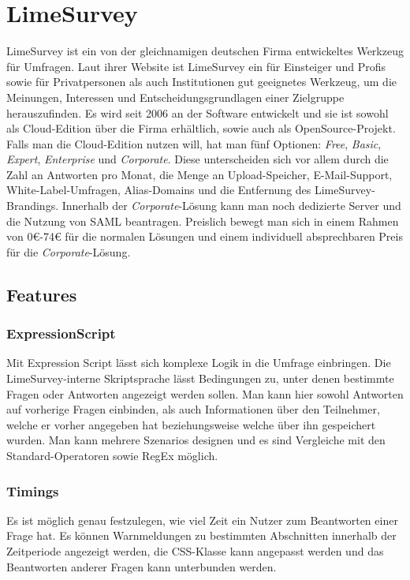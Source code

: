\section{LimeSurvey}

LimeSurvey ist ein von der gleichnamigen deutschen Firma entwickeltes Werkzeug für Umfragen.
Laut ihrer Website ist LimeSurvey ein für Einsteiger und Profis sowie für Privatpersonen als auch Institutionen gut geeignetes Werkzeug, um die Meinungen, Interessen und Entscheidungsgrundlagen einer Zielgruppe herauszufinden.
Es wird seit 2006 an der Software entwickelt und sie ist sowohl als Cloud-Edition über die Firma erhältlich, sowie auch als OpenSource-Projekt.\\

Falls man die Cloud-Edition nutzen will, hat man fünf Optionen: \textit{Free}, \textit{Basic}, \textit{Expert}, \textit{Enterprise} und \textit{Corporate}.
Diese unterscheiden sich vor allem durch die Zahl an Antworten pro Monat, die Menge an Upload-Speicher, E-Mail-Support, White-Label-Umfragen, Alias-Domains und die Entfernung des LimeSurvey-Brandings.
Innerhalb der \textit{Corporate}-Lösung kann man noch dedizierte Server und die Nutzung von SAML beantragen.
Preislich bewegt man sich in einem Rahmen von 0€-74€ für die normalen Lösungen und einem individuell absprechbaren Preis für die \textit{Corporate}-Lösung.

\subsection{Features}
\subsubsection{ExpressionScript}
\label{m:expr_script}
Mit Expression Script lässt sich komplexe Logik in die Umfrage einbringen.
Die LimeSurvey-interne Skriptsprache lässt Bedingungen zu, unter denen bestimmte Fragen oder Antworten angezeigt werden sollen.
Man kann hier sowohl Antworten auf vorherige Fragen einbinden, als auch Informationen über den Teilnehmer, welche er vorher angegeben hat beziehungsweise welche über ihn gespeichert wurden.
Man kann mehrere Szenarios designen und es sind Vergleiche mit den Standard-Operatoren sowie RegEx möglich.

\subsubsection{Timings}

Es ist möglich genau festzulegen, wie viel Zeit ein Nutzer zum Beantworten einer Frage hat.
Es können Warnmeldungen zu bestimmten Abschnitten innerhalb der Zeitperiode angezeigt werden, die CSS-Klasse kann angepasst werden und das Beantworten anderer Fragen kann unterbunden werden.

